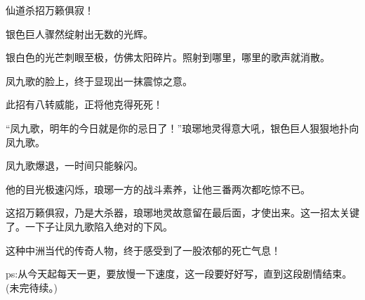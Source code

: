\begin{this_body}
仙道杀招万籁俱寂！

银色巨人骤然绽射出无数的光辉。

银白色的光芒刺眼至极，仿佛太阳碎片。照射到哪里，哪里的歌声就消散。

凤九歌的脸上，终于显现出一抹震惊之意。

此招有八转威能，正将他克得死死！

“凤九歌，明年的今日就是你的忌日了！”琅琊地灵得意大吼，银色巨人狠狠地扑向凤九歌。

凤九歌爆退，一时间只能躲闪。

他的目光极速闪烁，琅琊一方的战斗素养，让他三番两次都吃惊不已。

这招万籁俱寂，乃是大杀器，琅琊地灵故意留在最后面，才使出来。这一招太关键了。一下子让凤九歌陷入绝对的下风。

这种中洲当代的传奇人物，终于感受到了一股浓郁的死亡气息！

ps:从今天起每天一更，要放慢一下速度，这一段要好好写，直到这段剧情结束。(未完待续。)

\end{this_body}

